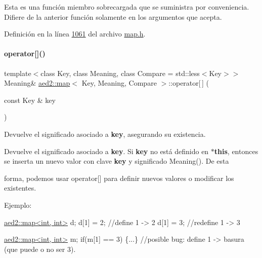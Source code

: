 Esta es una función miembro sobrecargada que se suministra por conveniencia. Difiere de la anterior función solamente en los argumentos que acepta. 

Definición en la línea \hyperlink{map_8h_source_l01061}{1061} del archivo \hyperlink{map_8h_source}{map.\+h}.

\mbox{\label{classaed2_1_1map_a96f23896164ab47bee48c26b803f9801_a96f23896164ab47bee48c26b803f9801}} 
\paragraph{\texorpdfstring{operator[]()}{operator[]()}}
{\footnotesize\ttfamily template$<$class Key, class Meaning, class Compare = std\+::less$<$\+Key$>$$>$ \\
Meaning\& \hyperlink{classaed2_1_1map}{aed2\+::map}$<$ Key, Meaning, Compare $>$\+::operator\mbox{[}$\,$\mbox{]} (\begin{DoxyParamCaption}\item[{const Key \&}]{key }\end{DoxyParamCaption})\hspace{0.3cm}{\ttfamily [inline]}}



Devuelve el significado asociado a {\bfseries key}, asegurando su existencia. 

Devuelve el significado asociado a {\bfseries key}. Si {\bfseries key} no está definido en {\bfseries $\ast$this}, entonces se inserta un nuevo valor con clave {\bfseries key} y significado Meaning(). De esta

forma, podemos usar {\ttfamily operator\mbox{[}\mbox{]}} para definir nuevos valores o modificar los existentes.

Ejemplo\+: 
\begin{DoxyCode}
\hyperlink{classaed2_1_1map}{aed2::map<int, int>} d;
d[1] = 2;      \textcolor{comment}{//define 1 -> 2}
d[1] = 3;      \textcolor{comment}{//redefine 1 -> 3}

\hyperlink{classaed2_1_1map}{aed2::map<int, int>} m;
\textcolor{keywordflow}{if}(m[1] == 3) \{...\} \textcolor{comment}{//posible bug: define 1 -> basura (que puede o no ser 3).}
\end{DoxyCode}



